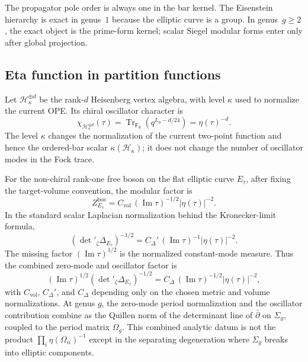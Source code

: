 \begin{remark}[Scope]
The propagator pole order is always one in the bar kernel. The
Eisenstein hierarchy is exact in genus~$1$ because the elliptic curve
is a group. In genus~$g\ge2$, the exact object is the prime-form
kernel; scalar Siegel modular forms enter only after global
projection.
\end{remark}

\subsection{Eta function in partition functions}
\label{subsec:eta-partition-functions}

\begin{theorem}\label{thm:eta-appearance}
Let $\mathcal H_\kappa^{\oplus d}$ be the rank-$d$ Heisenberg vertex
algebra, with level $\kappa$ used to normalize the current OPE. Its
chiral oscillator character is
\begin{equation}
\chi_{\mathcal H_\kappa^{\oplus d}}(\tau)
=\operatorname{Tr}_{\mathsf F_d}\!\left(q^{L_0-d/24}\right)
=\eta(\tau)^{-d}.
\end{equation}
The level $\kappa$ changes the normalization of the current two-point
function and hence the ordered-bar scalar $\kappa(\mathcal H_\kappa)$;
it does not change the number of oscillator modes in the Fock trace.

For the non-chiral rank-one free boson on the flat elliptic curve
$E_\tau$, after fixing the target-volume convention, the modular
factor is
\begin{equation}
Z_{E_\tau}^{\mathrm{bos}}
=C_{\mathrm{vol}}\,
(\operatorname{Im}\tau)^{-1/2}|\eta(\tau)|^{-2}.
\end{equation}
In the standard scalar Laplacian normalization behind the
Kronecker-limit formula,
\begin{equation}
(\det{}'_{\zeta}\Delta_{E_\tau})^{-1/2}
=C_\Delta'\,
(\operatorname{Im}\tau)^{-1}|\eta(\tau)|^{-2}.
\end{equation}
The missing factor $(\operatorname{Im}\tau)^{1/2}$ is the normalized
constant-mode measure. Thus the combined zero-mode and oscillator
factor is
\begin{equation}
(\operatorname{Im}\tau)^{1/2}
(\det{}'_{\zeta}\Delta_{E_\tau})^{-1/2}
=C_\Delta\,
(\operatorname{Im}\tau)^{-1/2}|\eta(\tau)|^{-2},
\end{equation}
with $C_{\mathrm{vol}}$, $C_\Delta'$, and $C_\Delta$ depending only
on the chosen metric and volume normalizations. At genus $g$, the
zero-mode period normalization and the oscillator contribution combine
as the Quillen norm of the determinant line of $\bar\partial$ on
$\Sigma_g$, coupled to the period matrix $\Omega_g$. This combined
analytic datum is not the product
$\prod_i\eta(\Omega_{ii})^{-1}$ except in the separating degeneration
where $\Sigma_g$ breaks into elliptic components.
\end{theorem}

